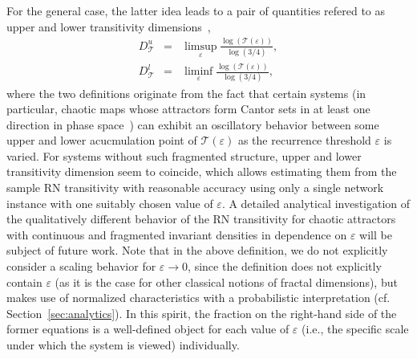 \documentclass[graybox]{svmult}
\begin{document}
For the general case, the latter idea leads to a pair of quantities refered to as upper and lower transitivity dimensions~\cite{Donner2011EPJB},
\begin{eqnarray}
D_{\mathcal{T}}^u &=& \limsup_{\varepsilon} \frac{\log(\mathcal{T}(\varepsilon))}{\log(3/4)}, \label{eq:dtu} \\
D_{\mathcal{T}}^l &=& \liminf_{\varepsilon} \frac{\log(\mathcal{T}(\varepsilon))}{\log(3/4)}, \label{eq:dtl}
\end{eqnarray}
\noindent
where the two definitions originate from the fact that certain systems (in particular, chaotic maps whose attractors form Cantor sets in at least one direction in phase space~\cite{Donner2011EPJB}) can exhibit an oscillatory behavior between some upper and lower acucmulation point of $\mathcal{T}(\varepsilon)$ as the recurrence threshold $\varepsilon$ is varied. For systems without such fragmented structure, upper and lower transitivity dimension seem to coincide, which allows estimating them from the sample RN transitivity with reasonable accuracy using only a single network instance with one suitably chosen value of $\varepsilon$. A detailed analytical investigation of the qualitatively different behavior of the RN transitivity for chaotic attractors with continuous and fragmented invariant densities in dependence on $\varepsilon$ will be subject of future work. Note that in the above definition, we do not explicitly consider a scaling behavior for $\varepsilon\to 0$, since the definition does not explicitly contain $\varepsilon$ (as it is the case for other classical notions of fractal dimensions), but makes use of normalized characteristics with a probabilistic interpretation (cf. Section~\ref{sec:analytics}). In this spirit, the fraction on the right-hand side of the former equations is a well-defined object for each value of $\varepsilon$ (i.e., the specific scale under which the system is viewed) individually.
\end{document}
